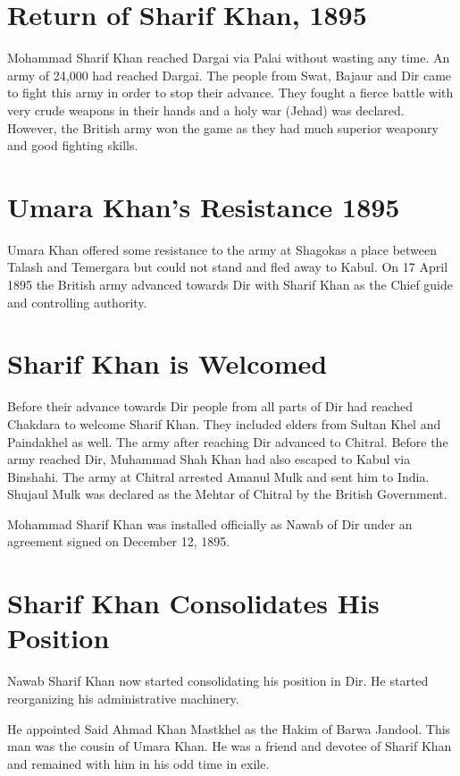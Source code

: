 \documentclass[twoside,openright]{book}
\begin{document}
\section{Return of Sharif Khan, 1895}

Mohammad Sharif Khan reached Dargai via Palai without wasting any time. An army
of 24,000 had reached Dargai. The people from Swat, Bajaur and Dir came to fight
this army in order to stop their advance. They fought a fierce battle with very
crude weapons in their hands and a holy war (Jehad) was declared. However, the
British army won the game as they had much superior weaponry and good fighting
skills.

\section{Umara Khan's Resistance 1895}

Umara Khan offered some resistance to the army at Shagokas a place between
Talash and Temergara but could not stand and fled away to Kabul. On 17 April
1895 the British army advanced towards Dir with Sharif Khan as the Chief guide
and controlling authority.

\section{Sharif Khan is Welcomed}

Before their advance towards Dir people from all parts of Dir
had reached Chakdara to welcome Sharif Khan. They included elders
from Sultan Khel and Paindakhel as well. The army after reaching
Dir advanced to Chitral. Before the army reached Dir, Muhammad
Shah Khan had also escaped to Kabul via Binshahi. The army at
Chitral arrested Amanul Mulk and sent him to India. Shujaul Mulk
was declared as the Mehtar of Chitral by the British Government.

Mohammad Sharif Khan was installed officially as Nawab of Dir
under an agreement signed on December 12, 1895.

\section{Sharif Khan Consolidates His Position}

Nawab Sharif Khan now started consolidating his position in Dir. He started
reorganizing his administrative machinery.

He appointed Said Ahmad Khan Mastkhel as the Hakim of Barwa Jandool. This man
was the cousin of Umara Khan. He was a friend and devotee of Sharif Khan and
remained with him in his odd time in exile.
\end{document}
